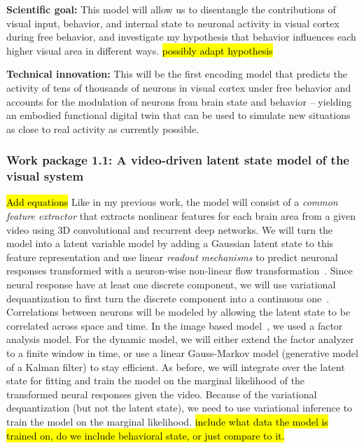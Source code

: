 \documentclass[B2,COG]{ercgrant}
\begin{document}
\textbf{Scientific goal:} This model will allow us to disentangle the contributions of visual input, behavior, and internal state to neuronal activity in visual cortex during free behavior, and investigate my hypothesis that behavior influences each higher visual area in different ways. \hl{possibly adapt hypothesis}

\textbf{Technical innovation:} This will be the first encoding model that predicts the activity of tens of thousands of neurons in visual cortex under free behavior and accounts for the modulation of neurons from brain state and behavior -- yielding an embodied functional digital twin that can be used to simulate new situations as close to real activity as currently possible.



\subsubsection{Work package 1.1: A video-driven latent state model of the visual system\hfill{}}
\hl{Add equations}
Like in my previous work, the model will consist of a \textit{common feature extractor} that extracts nonlinear features for each brain area from a given video using 3D convolutional and recurrent deep networks.
We will turn the model into a latent variable model by adding a Gaussian latent state to this feature representation and use linear \textit{readout mechanisms} to predict neuronal responses transformed with a neuron-wise non-linear flow transformation~\parencite{Bashiri2021-or, Rezende2015-mx}.
Since neural response have at least one discrete component, we will use variational dequantization to first turn the discrete component into a continuous one~\parencite{Hoogeboom2021-zs}.
Correlations between neurons will be modeled by allowing the latent state to be correlated across space and time. 
In the image based model~\parencite{Bashiri2021-or}, we used a factor analysis model. 
For the dynamic model, we will either extend the factor analyzer to a finite window in time, or use a linear Gauss-Markov model (generative model of a Kalman filter) to stay efficient. 
As before, we will integrate over the latent state for fitting and train the model on the marginal likelihood of the transformed neural responses given the video.
Because of the variational dequantization (but not the latent state), we need to use variational inference to train the model on the marginal likelihood. 
\hl{include what data the model is trained on, do we include behavioral state, or just compare to it.}
\end{document}
